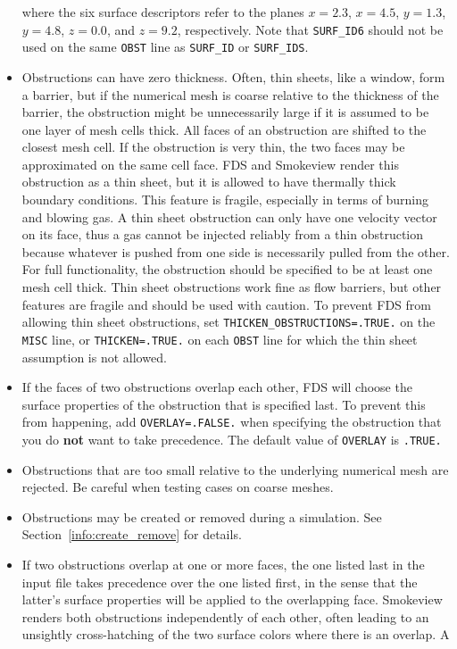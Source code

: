 \documentclass[11pt]{book}
\newcommand{\ct}{\tt\small}
\begin{document}
\begin{itemize}
\noindent
where the six surface descriptors refer to the planes $x=2.3$, $x=4.5$, $y=1.3$, $y=4.8$,
$z=0.0$, and $z=9.2$, respectively.
Note that {\ct SURF\_ID6} should not be used on the same {\ct OBST}
line as {\ct SURF\_ID} or {\ct SURF\_IDS}.
\item Obstructions can have zero thickness. Often, thin sheets, like a window, form a barrier,
but if the numerical mesh is coarse relative to the thickness of the barrier, the obstruction
might be unnecessarily large if it is assumed to be one layer of mesh cells thick. All faces
of an obstruction are shifted to the closest mesh cell. If the obstruction is very thin, the two
faces may be approximated on the same cell face. FDS and Smokeview render
this obstruction as a thin sheet, but it is allowed to have thermally
thick boundary conditions. This feature is fragile, especially in terms
of burning and blowing gas. A thin sheet obstruction can only have one velocity
vector on its face, thus a gas cannot be injected reliably from a
thin obstruction because whatever is pushed from one side is necessarily pulled from the other.
For full functionality, the obstruction should be specified to
be at least one mesh cell thick. Thin sheet obstructions
work fine as flow barriers, but other features are fragile and should be used with
caution. To prevent FDS from allowing thin sheet obstructions, set {\ct THICKEN\_OBSTRUCTIONS=.TRUE.} on the
{\ct MISC} line, or {\ct THICKEN=.TRUE.} on each {\ct OBST} line for which the thin sheet assumption is not allowed.
\item If the faces of two obstructions overlap each other, FDS will choose the surface properties of the obstruction that is specified last. To prevent this from happening,
add {\ct OVERLAY=.FALSE.} when specifying the obstruction that you do {\bf not} want to take precedence. The default value of {\ct OVERLAY} is {\ct .TRUE.}
\item Obstructions that are
too small relative to the underlying numerical mesh are rejected.
Be careful when testing cases on coarse meshes.
\item Obstructions may be created or removed during a simulation. See
Section~\ref{info:create_remove} for details.
\item If two obstructions overlap at one or more faces, the one listed last in the input file takes precedence over the one
listed first, in the sense that the latter's surface properties will be applied to the overlapping face. Smokeview renders both obstructions
independently of each other, often leading to an unsightly cross-hatching of the two surface colors where there is an overlap. A

\end{itemize}
\end{document}
